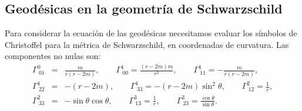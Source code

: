 %
%

\subsection{Geodésicas en la geometría de Schwarzschild}

Para considerar la ecuación de las geodésicas necesitamos evaluar los
símbolos de Christoffel para la métrica de Schwarzschild, en coordenadas de curvatura. Las componentes no nulas son:
\begin{eqnarray}
\Gamma_{\ 01}^{0} &=&\frac{m}{r(r-2m) },\qquad \Gamma_{\
00}^1=\frac{(r-2m) m}{r^3},\qquad \Gamma_{\ 11}^1=-\frac{m}{r\left(
r-2m\right) }, \nonumber \\
\Gamma_{\ 22}^1 &=&-(r-2m) ,\qquad \Gamma_{\ 33}^1=-\left(
r-2m\right) \sin ^2\theta ,\qquad \Gamma_{\ 12}^2=\frac{1}{r}, \nonumber \\
\Gamma_{\ 33}^2 &=&-\sin \theta \cos \theta ,\qquad
\Gamma_{\ 13}^3=\frac{1}{r},\qquad \Gamma_{\ 23}^3=\frac{\cos\theta}{\sin
\theta}.
\end{eqnarray}

